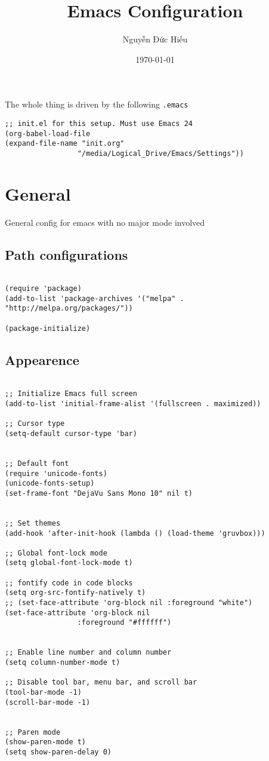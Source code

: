 \documentclass[11pt]{article}
\author{Nguyễn Đức Hiếu}
\date{\today}
\title{Emacs Configuration}
\begin{document}
\maketitle
The whole thing is driven by the following \texttt{.emacs}

\begin{verbatim}
;; init.el for this setup. Must use Emacs 24
(org-babel-load-file
(expand-file-name "init.org"
                 "/media/Logical_Drive/Emacs/Settings"))
\end{verbatim}

\section*{General}
\label{sec:org3cad4ac}
General config for emacs with no major mode involved
\subsection*{Path configurations}
\label{sec:org5be3dba}

\begin{verbatim}

(require 'package)
(add-to-list 'package-archives '("melpa" . "http://melpa.org/packages/"))

(package-initialize)

\end{verbatim}

\subsection*{Appearence}
\label{sec:org3f3a779}

\begin{verbatim}

;; Initialize Emacs full screen 
(add-to-list 'initial-frame-alist '(fullscreen . maximized))

;; Cursor type
(setq-default cursor-type 'bar)


;; Default font
(require 'unicode-fonts)
(unicode-fonts-setup)
(set-frame-font "DejaVu Sans Mono 10" nil t)


;; Set themes
(add-hook 'after-init-hook (lambda () (load-theme 'gruvbox)))

;; Global font-lock mode
(setq global-font-lock-mode t)

;; fontify code in code blocks
(setq org-src-fontify-natively t)
;; (set-face-attribute 'org-block nil :foreground "white")
(set-face-attribute 'org-block nil 
				 :foreground "#ffffff")


;; Enable line number and column number
(setq column-number-mode t)

;; Disable tool bar, menu bar, and scroll bar
(tool-bar-mode -1)
(scroll-bar-mode -1)


;; Paren mode
(show-paren-mode t)
(setq show-paren-delay 0)


\end{verbatim}
\end{document}
